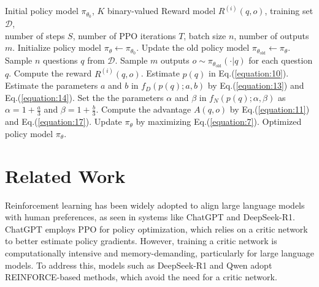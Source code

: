 \documentclass{article}
\theoremstyle{plain}
\theoremstyle{definition}
\theoremstyle{remark}
\begin{document}
\begin{algorithm}[t]
    \caption{BNPO: Beta Normalization Policy Optimization}
    \label{alg:1}
    \begin{algorithmic}[1]
        \REQUIRE 
        Initial policy model $\pi_{\theta_{0}}$, $K$ binary-valued Reward model $R^{(i)}(q,o)$, training set $\mathcal{D}$,\\ number of steps $S$, number of PPO iterations $T$, batch size $n$, number of outputs $m$.
        \STATE Initialize policy model $\pi_\theta \gets \pi_{\theta_{0}}$.
            \STATE Update the old policy model $\pi_{\theta_{\text{old}}} \gets \pi_\theta$.
            \STATE Sample $n$ questions $q$ from $\mathcal{D}$.
            \STATE Sample $m$ outputs $o \sim \pi_{\theta_{\text{old}}}(\cdot | q)$ for each question $q$.
                \STATE Compute the reward $R^{(i)}(q,o)$.
            \ENDFOR
            \ENDFOR
            \STATE Estimate $p(q)$ in Eq.(\ref{equation:10}).
            \ENDFOR
            \STATE Estimate the parameters $a$ and $b$ in $f_{D}(p(q);a,b)$ by Eq.(\ref{equation:13}) and Eq.(\ref{equation:14}).
            \STATE Set the the parameters $\alpha$ and $\beta$  in $f_{N}(p(q);\alpha,\beta)$ as $\alpha=1+\frac{a}{3}$ and $\beta=1+\frac{b}{3}$.
                \STATE Compute the advantage $A(q,o)$ by Eq.(\ref{equation:11}) and Eq.(\ref{equation:17}).
            \ENDFOR
                \STATE Update $\pi_\theta$ by maximizing Eq.(\ref{equation:7}).
            \ENDFOR
        \ENDFOR
        \ENSURE Optimized policy model $\pi_\theta$.
    \end{algorithmic}
\end{algorithm}




\section{Related Work}
Reinforcement learning has been widely adopted to align large language models with human preferences, as seen in systems like ChatGPT and DeepSeek-R1. ChatGPT \citep{ouyang2022training} employs PPO for policy optimization, which relies on a critic network to better estimate policy gradients. However, training a critic network is computationally intensive and memory-demanding, particularly for large language models. To address this, models such as DeepSeek-R1 and Qwen \citep{yang2024qwen2} adopt REINFORCE-based methods, which avoid the need for a critic network.
\end{document}
